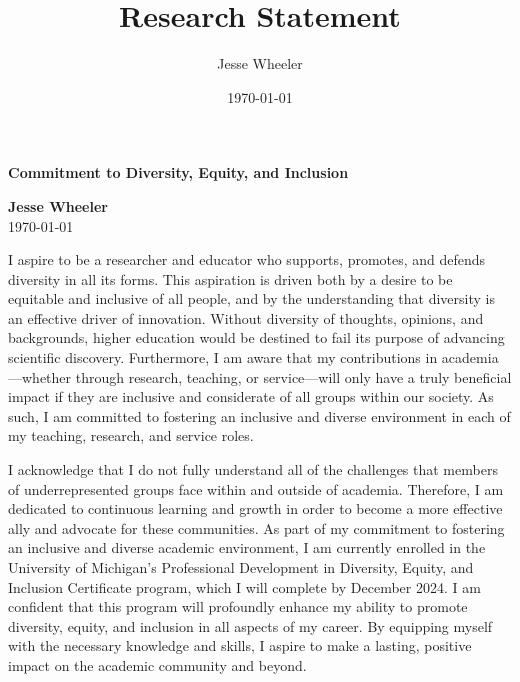 \documentclass[11pt]{article}
\title{Research Statement}
\author{Jesse Wheeler}
\date{\today}
\begin{document}
\rule{0mm}{1mm}
\vspace{-20mm}


\vspace{1mm}

\begin{center}
{\Large {\bf Commitment to Diversity, Equity, and Inclusion}}

\vspace{2mm}

{\bf Jesse Wheeler} \\
\today
\end{center}


\vspace{4mm}

\noindent I aspire to be a researcher and educator who supports, promotes, and defends diversity in all its forms.
This aspiration is driven both by a desire to be equitable and inclusive of all people, and by the understanding that diversity is an effective driver of innovation.
Without diversity of thoughts, opinions, and backgrounds, higher education would be destined to fail its purpose of advancing scientific discovery.
Furthermore, I am aware that my contributions in academia---whether through research, teaching, or service---will only have a truly beneficial impact if they are inclusive and considerate of all groups within our society.
As such, I am committed to fostering an inclusive and diverse environment in each of my teaching, research, and service roles.


I acknowledge that I do not fully understand all of the challenges that members of underrepresented groups face within and outside of academia.
Therefore, I am dedicated to continuous learning and growth in order to become a more effective ally and advocate for these communities.
As part of my commitment to fostering an inclusive and diverse academic environment, I am currently enrolled in the University of Michigan's Professional Development in Diversity, Equity, and Inclusion Certificate program, which I will complete by December 2024.
I am confident that this program will profoundly enhance my ability to promote diversity, equity, and inclusion in all aspects of my career.
By equipping myself with the necessary knowledge and skills, I aspire to make a lasting, positive impact on the academic community and beyond.
\end{document}
